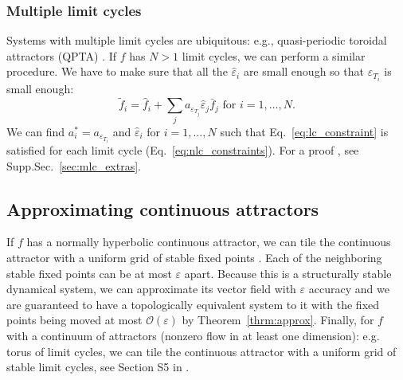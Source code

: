 \documentclass{article}
\newcounter{ct}
\begin{document}
\subsubsection{Multiple limit cycles}
Systems with multiple limit cycles are ubiquitous: e.g., quasi-periodic toroidal attractors (QPTA) \citep{Park2023a}.
%
If $f$ has $N>1$ limit cycles, we can perform a similar procedure.
We have to make sure that all the $\hat{\varepsilon}_i$ are small enough so that $\varepsilon_{T_i}$ is small enough:
\begin{equation}\label{eq:nlc_vfs}
\tilde f_i = \hat{f}_i + \sum_{j}a_{\varepsilon_{T_j}}\hat{\varepsilon}_j\bar{f}_j \text{ for } i=1,\dots, N.
\end{equation}
We can find $a_i^* = a_{\varepsilon_{T_i}}$ and $\hat\varepsilon_i$ for $i=1,\dots,N$ such that Eq.~\ref{eq:lc_constraint} is satisfied for each limit cycle (Eq.~\ref{eq:nlc_constraints}).
For a proof , see Supp.Sec.~\ref{sec:mlc_extras}.




\subsection{Approximating continuous attractors}\label{sec:ca_theorem}


If $f$ has a normally hyperbolic continuous attractor, we can tile the continuous attractor with a uniform grid of stable fixed points  \citep{Sagodi2024a}.
Each of the neighboring stable fixed points can be at most $\varepsilon$ apart. %
Because this is a structurally stable dynamical system,  we can approximate its vector field with $\varepsilon$ accuracy and we are guaranteed to have a topologically equivalent system to it with the fixed points being moved at most $\mathcal{O}(\varepsilon)$ by Theorem~\ref{thrm:approx}. 
Finally, for $f$ with a continuum of attractors (nonzero flow in at least one dimension): e.g. torus of limit cycles, we can tile the continuous attractor with a uniform grid of stable limit cycles, see Section S5 in  \citep{Sagodi2024a}.
\end{document}
